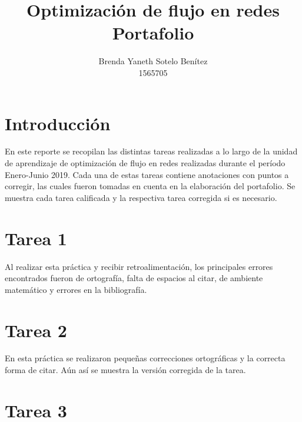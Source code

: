 \documentclass[11pt,a4paper]{article}
\author{Brenda Yaneth Sotelo Benítez \\ 1565705}
\title{Optimización de flujo en redes\\ 
Portafolio}
\begin{document}
\maketitle 

\setlength{\parindent}{0cm}

\section*{Introducción}

En este reporte se recopilan las distintas tareas realizadas a lo largo de la unidad de aprendizaje de optimización de flujo en redes realizadas durante el período Enero-Junio 2019. Cada una de estas tareas contiene anotaciones con puntos a corregir, las cuales fueron tomadas en cuenta en la elaboración del portafolio. Se muestra cada tarea calificada y la respectiva tarea corregida si es necesario.  


\newpage

\section*{Tarea 1}
Al realizar esta práctica y recibir retroalimentación, los principales errores encontrados fueron de ortografía, falta de espacios al citar, de ambiente matemático y errores en la bibliografía. 

\newpage

\newpage


\section*{Tarea 2}

En esta práctica se realizaron pequeñas correcciones ortográficas y la correcta forma de citar.  Aún así se muestra la versión corregida de la tarea. 

\newpage

\newpage


\section*{Tarea 3}
\end{document}
